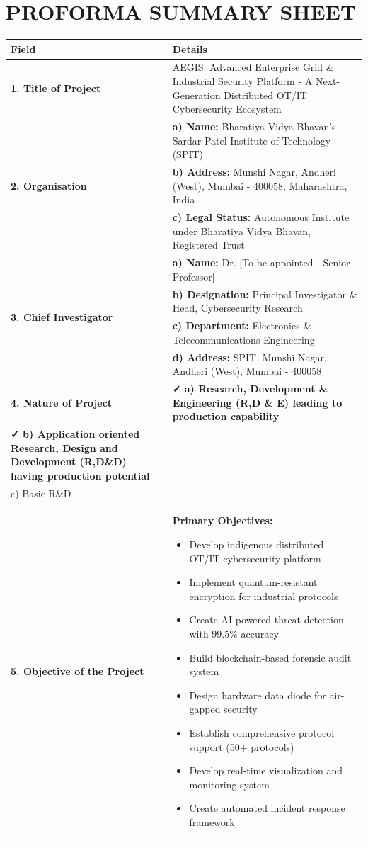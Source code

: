 \documentclass[12pt,a4paper]{article}
\begin{document}
\section{PROFORMA SUMMARY SHEET}

\begin{longtable}{|p{3cm}|p{12cm}|}
\hline
\rowcolor{lightblue}
\textbf{Field} & \textbf{Details} \\
\hline
\endhead

\textbf{1. Title of Project} & 
AEGIS: Advanced Enterprise Grid \& Industrial Security Platform - A Next-Generation Distributed OT/IT Cybersecurity Ecosystem \\
\hline

\multirow{3}{*}{\textbf{2. Organisation}} & 
\textbf{a) Name:} Bharatiya Vidya Bhavan's Sardar Patel Institute of Technology (SPIT) \\
& \textbf{b) Address:} Munshi Nagar, Andheri (West), Mumbai - 400058, Maharashtra, India \\
& \textbf{c) Legal Status:} Autonomous Institute under Bharatiya Vidya Bhavan, Registered Trust \\
\hline

\multirow{4}{*}{\textbf{3. Chief Investigator}} & 
\textbf{a) Name:} Dr. [To be appointed - Senior Professor] \\
& \textbf{b) Designation:} Principal Investigator \& Head, Cybersecurity Research \\
& \textbf{c) Department:} Electronics \& Telecommunications Engineering \\
& \textbf{d) Address:} SPIT, Munshi Nagar, Andheri (West), Mumbai - 400058 \\
\hline

\textbf{4. Nature of Project} & 
\textbf{✓ a) Research, Development \& Engineering (R,D \& E) leading to production capability}\\
\textbf{✓ b) Application oriented Research, Design and Development (R,D\&D) having production potential}\\
c) Basic R\&D \\
\hline

\textbf{5. Objective of the Project} & 
\textbf{Primary Objectives:}
\begin{itemize}[leftmargin=1em]
    \item Develop indigenous distributed OT/IT cybersecurity platform
    \item Implement quantum-resistant encryption for industrial protocols
    \item Create AI-powered threat detection with 99.5\% accuracy
    \item Build blockchain-based forensic audit system
    \item Design hardware data diode for air-gapped security
    \item Establish comprehensive protocol support (50+ protocols)
    \item Develop real-time visualization and monitoring system
    \item Create automated incident response framework
\end{itemize} \\
\hline


\end{longtable}
\end{document}
